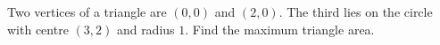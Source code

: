 Two vertices of a triangle are $(0,0)$ and $(2,0)$. The third lies on the circle with centre $(3,2)$ and radius $1$. Find the maximum triangle area.
